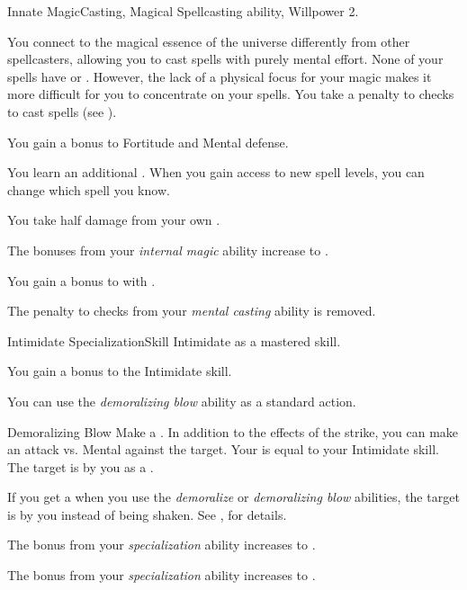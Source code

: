     \begin{feat}{Innate Magic}{Casting, Magical}
        \featpre Spellcasting ability, Willpower 2.

         You connect to the magical essence of the universe differently from other spellcasters, allowing you to cast spells with purely mental effort.
        None of your spells have  or .
        However, the lack of a physical focus for your magic makes it more difficult for you to concentrate on your spells.
        You take a  penalty to  checks to cast spells (see ).

         You gain a  bonus to Fortitude and Mental defense.

         You learn an additional .
        When you gain access to new spell levels, you can change which spell you know.

         You take half damage from your own .

         The bonuses from your \textit{internal magic} ability increase to .

         You gain a  bonus to  with .

         The penalty to  checks from your \textit{mental casting} ability is removed.
    \end{feat}

    \begin{feat}{Intimidate Specialization}{Skill}
        \featpre Intimidate as a mastered skill.

         You gain a  bonus to the Intimidate skill.

         You can use the \textit{demoralizing blow} ability as a standard action.
        \begin{apability}{Demoralizing Blow}
            Make a .
            In addition to the effects of the strike, you can make an attack vs. Mental against the target.
            Your  is equal to your Intimidate skill.
            \hit The target is \shaken by you as a .
        \end{apability}

         If you get a  when you use the \textit{demoralize} or \textit{demoralizing blow} abilities, the target is \frightened by you instead of being shaken.
        See , for details.

         The bonus from your \textit{specialization} ability increases to .

         The bonus from your \textit{specialization} ability increases to .
    \end{feat}

